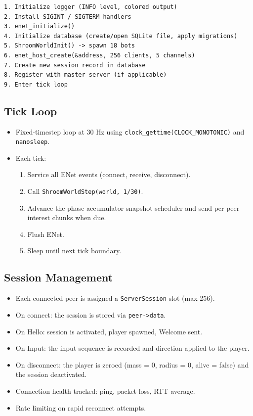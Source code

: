 \documentclass[11pt]{article}
\begin{document}
\begin{verbatim}
1. Initialize logger (INFO level, colored output)
2. Install SIGINT / SIGTERM handlers
3. enet_initialize()
4. Initialize database (create/open SQLite file, apply migrations)
5. ShroomWorldInit() -> spawn 18 bots
6. enet_host_create(&address, 256 clients, 5 channels)
7. Create new session record in database
8. Register with master server (if applicable)
9. Enter tick loop
\end{verbatim}

\subsection{Tick Loop}

\begin{itemize}
  \item Fixed-timestep loop at 30 Hz using \texttt{clock\_gettime(CLOCK\_MONOTONIC)} and \texttt{nanosleep}.
  \item Each tick:
    \begin{enumerate}
      \item Service all ENet events (connect, receive, disconnect).
      \item Call \texttt{ShroomWorldStep(world, 1/30)}.
      \item Advance the phase-accumulator snapshot scheduler and send per-peer interest chunks when due.
      \item Flush ENet.
      \item Sleep until next tick boundary.
    \end{enumerate}
\end{itemize}

\subsection{Session Management}

\begin{itemize}
  \item Each connected peer is assigned a \texttt{ServerSession} slot (max 256).
  \item On connect: the session is stored via \texttt{peer->data}.
  \item On Hello: session is activated, player spawned, Welcome sent.
  \item On Input: the input sequence is recorded and direction applied to the player.
  \item On disconnect: the player is zeroed (mass = 0, radius = 0, alive = false) and the session deactivated.
  \item Connection health tracked: ping, packet loss, RTT average.
  \item Rate limiting on rapid reconnect attempts.
\end{itemize}
\end{document}
